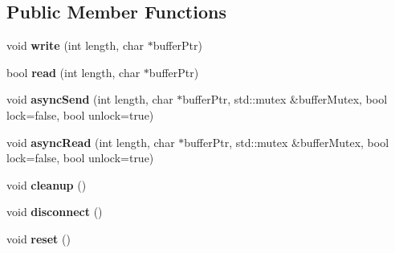 \subsection*{Public Member Functions}
\begin{DoxyCompactItemize}
\item 
\hypertarget{classpersonal_robotics_1_1_tcp_a44ff0fd6cf8d2374d9c93002c40e2eea}{}void {\bfseries write} (int length, char $\ast$buffer\+Ptr)\label{classpersonal_robotics_1_1_tcp_a44ff0fd6cf8d2374d9c93002c40e2eea}

\item 
\hypertarget{classpersonal_robotics_1_1_tcp_ad66433ec27e099670667dec2b7684543}{}bool {\bfseries read} (int length, char $\ast$buffer\+Ptr)\label{classpersonal_robotics_1_1_tcp_ad66433ec27e099670667dec2b7684543}

\item 
\hypertarget{classpersonal_robotics_1_1_tcp_ad998f98df05e6e9db7bb9f8ab4df9268}{}void {\bfseries async\+Send} (int length, char $\ast$buffer\+Ptr, std\+::mutex \&buffer\+Mutex, bool lock=false, bool unlock=true)\label{classpersonal_robotics_1_1_tcp_ad998f98df05e6e9db7bb9f8ab4df9268}

\item 
\hypertarget{classpersonal_robotics_1_1_tcp_a6442eb84d70478d374685b5638358d57}{}void {\bfseries async\+Read} (int length, char $\ast$buffer\+Ptr, std\+::mutex \&buffer\+Mutex, bool lock=false, bool unlock=true)\label{classpersonal_robotics_1_1_tcp_a6442eb84d70478d374685b5638358d57}

\item 
\hypertarget{classpersonal_robotics_1_1_tcp_acf15c96134bcda539cfef8fe98cba20b}{}void {\bfseries cleanup} ()\label{classpersonal_robotics_1_1_tcp_acf15c96134bcda539cfef8fe98cba20b}

\item 
\hypertarget{classpersonal_robotics_1_1_tcp_a62043b28ed7a7158c10e62e73c552cd7}{}void {\bfseries disconnect} ()\label{classpersonal_robotics_1_1_tcp_a62043b28ed7a7158c10e62e73c552cd7}

\item 
\hypertarget{classpersonal_robotics_1_1_tcp_ade9cef8167d53d198ac84cb1c934d5fd}{}void {\bfseries reset} ()\label{classpersonal_robotics_1_1_tcp_ade9cef8167d53d198ac84cb1c934d5fd}

\end{DoxyCompactItemize}
